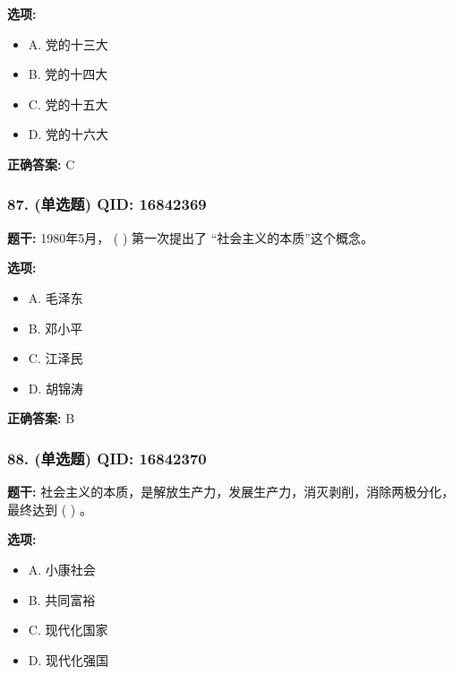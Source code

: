 \documentclass[12pt,UTF8]{ctexart}
\begin{document}
\textbf{选项:}
\begin{itemize}[leftmargin=*]

  \item A. 党的十三大

  \item B. 党的十四大

  \item C. 党的十五大

  \item D. 党的十六大

\end{itemize}

\textbf{正确答案:}
C

\vspace{0.3em}\hrulefill\vspace{0.7em}

\subsubsection*{87. (单选题) \small QID: 16842369}

\textbf{题干:}
1980年5月， ( ) 第一次提出了 “社会主义的本质”这个概念。

\textbf{选项:}
\begin{itemize}[leftmargin=*]

  \item A. 毛泽东

  \item B. 邓小平

  \item C. 江泽民

  \item D. 胡锦涛

\end{itemize}

\textbf{正确答案:}
B

\vspace{0.3em}\hrulefill\vspace{0.7em}

\subsubsection*{88. (单选题) \small QID: 16842370}

\textbf{题干:}
社会主义的本质，是解放生产力，发展生产力，消灭剥削，消除两极分化，最终达到 ( ) 。

\textbf{选项:}
\begin{itemize}[leftmargin=*]

  \item A. 小康社会

  \item B. 共同富裕

  \item C. 现代化国家

  \item D. 现代化强国

\end{itemize}
\end{document}
